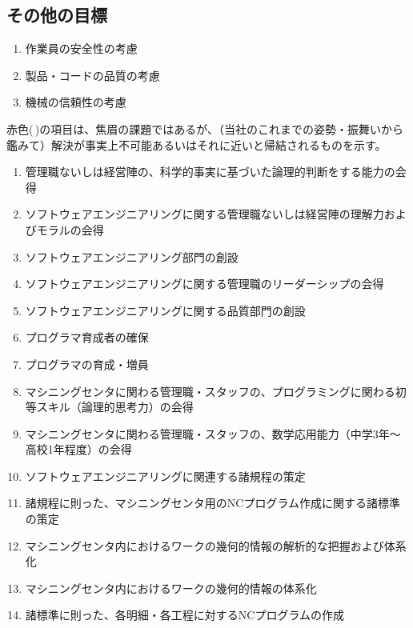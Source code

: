 \subsection{その他の目標}
\begin{enumerate}[label=\sarrow]
\item 作業員の安全性の考慮
\item 製品・コードの品質の考慮
\item 機械の信頼性の考慮
\end{enumerate}


\clearpage
赤色(\,\sarrow[red]\!)の項目は、焦眉の課題ではあるが、（当社のこれまでの姿勢・振舞いから鑑みて）解決が事実上不可能あるいはそれに近いと帰結されるものを示す。
\begin{enumerate}[label=\sarrow]
\item[{\sarrow[red]}] 管理職ないしは経営陣の、科学的事実に基づいた論理的判断をする能力の会得
\item[{\sarrow[red]}] ソフトウェアエンジニアリングに関する管理職ないしは経営陣の理解力およびモラルの会得
\item[{\sarrow[red]}] ソフトウェアエンジニアリング部門の創設
\item[{\sarrow[red]}] ソフトウェアエンジニアリングに関する管理職のリーダーシップの会得
\item[{\sarrow[red]}] ソフトウェアエンジニアリングに関する品質部門の創設
\item[{\sarrow[red]}] プログラマ育成者の確保
\item[{\sarrow[red]}] プログラマの育成・増員
\item[{\sarrow[red]}] マシニングセンタに関わる管理職・スタッフの、プログラミングに関わる初等スキル（論理的思考力）の会得
\item[{\sarrow[red]}] マシニングセンタに関わる管理職・スタッフの、数学応用能力（中学3年～高校1年程度）の会得
\item ソフトウェアエンジニアリングに関連する諸規程の策定
\item 諸規程に則った、マシニングセンタ用のNCプログラム作成に関する諸標準の策定
\item マシニングセンタ内におけるワークの幾何的情報の解析的な把握および体系化
\item マシニングセンタ内におけるワークの幾何的情報の体系化
\item 諸標準に則った、各明細・各工程に対するNCプログラムの作成
\end{enumerate}


